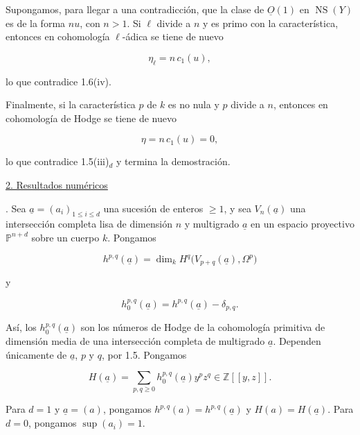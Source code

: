 Supongamos, para llegar a una contradicción, que la clase de
$\underline O(1)$ en $\operatorname{NS}(Y)$ es de la forma $nu$, con
$n>1$. Si $\ell$ divide a $n$ y es primo con la característica, entonces en
cohomología $\ell$-ádica se tiene de nuevo

\pageoriginale

\begin{equation*}
\eta_\ell=n\,c_1(u),
\end{equation*}

lo que contradice 1.6(iv).

Finalmente, si la característica $p$ de $k$ es no nula y $p$ divide a $n$,
entonces en cohomología de Hodge se tiene de nuevo

\begin{equation*}
\eta=n\,c_1(u)=0,
\end{equation*}

lo que contradice 1.5(iii)$_d$ y termina la demostración.

\bigskip
\noindent\underline{2. Resultados numéricos}

\medskip
{}. Sea $\underline a=(a_i)_{1\leq i\leq d}$ una sucesión de
enteros $\geq1$, y sea $V_n(\underline a)$ una intersección completa lisa de
dimensión $n$ y multigrado $\underline a$ en un espacio proyectivo
$\mathbb P^{n+d}$ sobre un cuerpo $k$. Pongamos

\begin{equation*}
h^{p,q}(\underline a)
=\dim_k H^q\bigl(V_{p+q}(\underline a),\Omega^p\bigr)
\end{equation*}

y

\begin{equation*}
h_0^{p,q}(\underline a)=h^{p,q}(\underline a)-\delta_{p,q}.
\end{equation*}

Así, los $h_0^{p,q}(\underline a)$ son los números de Hodge de la
cohomología primitiva de dimensión media de una intersección completa de
multigrado $\underline a$. Dependen únicamente de $\underline a$, $p$ y
$q$, por 1.5. Pongamos

\begin{equation}\tag{2.1.1}
H(\underline a)=\sum_{p,q\geq0}h_0^{p,q}(\underline a)y^pz^q
\in\mathbb Z[[y,z]].
\end{equation}

Para $d=1$ y $\underline a=(a)$, pongamos
$h^{p,q}(a)=h^{p,q}(\underline a)$ y $H(a)=H(\underline a)$. Para $d=0$,
pongamos $\sup(a_i)=1$.

